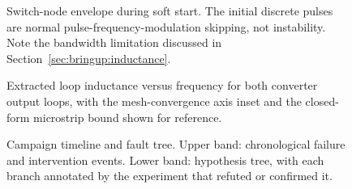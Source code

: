 \begin{figure}[H]
\centering
\caption{Switch-node envelope during soft start. The initial discrete pulses are
normal pulse-frequency-modulation skipping, not instability. Note the bandwidth
limitation discussed in Section~\ref{sec:bringup:inductance}.\label{fig:scope-sw}}
\end{figure}

\begin{figure}[H]
\centering
\caption{Extracted loop inductance versus frequency for both converter output
loops, with the mesh-convergence axis inset and the closed-form microstrip bound
shown for reference.\label{fig:Lsweep}}
\end{figure}

\begin{figure}[H]
\centering
\caption{Campaign timeline and fault tree. Upper band: chronological failure and
intervention events. Lower band: hypothesis tree, with each branch annotated by the
experiment that refuted or confirmed it.\label{fig:faulttree}}
\end{figure}



